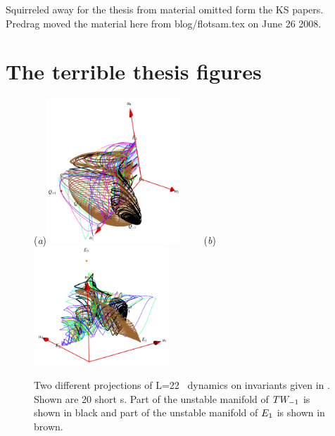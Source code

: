 \renewcommand{\inputfile}{\version\ - edited 2008-06-26 flotsam}
%

Squirreled away for the thesis from material omitted form the KS papers.
Predrag moved the material here from blog/flotsam.tex on June 26 2008.

\section{The terrible thesis figures}

\begin{figure}[h]
\begin{center}
  (\textit{a})\includegraphics[width=0.45\textwidth, clip=true]{../figs/ksSO2inv134}
~~~~(\textit{b})\includegraphics[width=0.45\textwidth, clip=true]{../figs/ksSO2inv145}
\end{center}
\caption[\KS\  reduced \statesp\ projection II]
{Two different projections of L=22 \KS\ dynamics on invariants
given in . Shown are 20
short \rpo s. Part of the unstable manifold of
$TW_{-1}$ is shown in black and part of the unstable manifold of $E_{1}$ is
shown in brown.}
\label{fig:SO2inv}
\end{figure}


